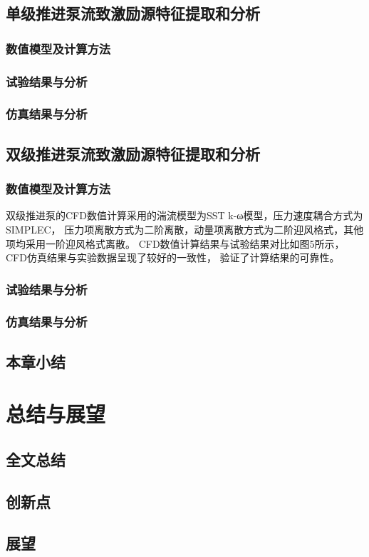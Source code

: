 \section{单级推进泵流致激励源特征提取和分析}
\subsection{数值模型及计算方法}

\subsection{试验结果与分析}
\subsection{仿真结果与分析}
\section{双级推进泵流致激励源特征提取和分析}
\subsection{数值模型及计算方法}
双级推进泵的CFD数值计算采用的湍流模型为SST k-ω模型，压力速度耦合方式为SIMPLEC，
压力项离散方式为二阶离散，动量项离散方式为二阶迎风格式，其他项均采用一阶迎风格式离散。
CFD数值计算结果与试验结果对比如图5所示，CFD仿真结果与实验数据呈现了较好的一致性，
验证了计算结果的可靠性。
\subsection{试验结果与分析}
\subsection{仿真结果与分析}
\section{本章小结}

\chapter{总结与展望}
\section{全文总结}
\section{创新点}
\section{展望}
